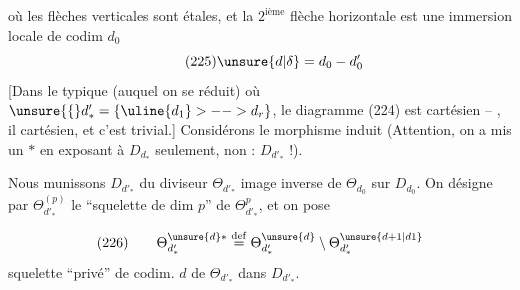 où les flèches verticales sont étales,
et la $2^{\mathrm{ième}}$ flèche horizontale est une
immersion locale de codim $d_0$
\[
\tag{225}\unsure{d|\delta}=d_0-d'_0
\]
[Dans le typique (auquel on se réduit)
où $\unsure{\{}d'_* = \{\uline{d_1}>-- >d_r\}$, le diagramme
(224) est cartésien -- , il
  cartésien,  et c'est trivial.]
Considérons le morphisme induit
(Attention, on a mis un $*$ en exposant
à $D_{d_*}$ seulement, non : $D_{d'_*}$ !).

Nous munissons $D_{d'_*}$ du diviseur
$\Theta_{d'_*}$ image inverse de $\Theta_{d_0}$ sur $D_{d_0}$.
On désigne par $\Theta_{d'_*}^{(p)}$ le ``squelette
de dim $p$'' de $\Theta_{d'_*}^{p}$, et  on pose


\[
(226)\qquad
\Theta_{d'_*}^{\unsure{d}*}\overset{\mathrm{def}}=
\Theta_{d'_*}^{\unsure{d}}\setminus
\Theta_{d'_*}^{\unsure{d+1|d1}}
\]
squelette ``privé'' de codim. $d$ de
$\Theta_{d'_*}$ dans $D_{d'_*}$.

